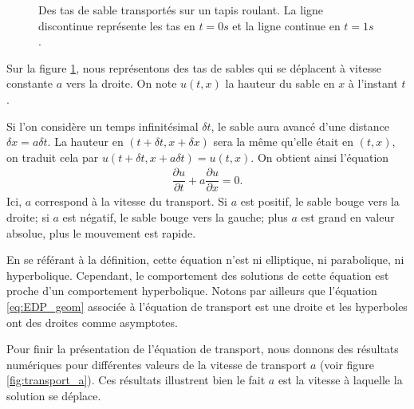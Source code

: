 \documentclass[12pt,a4paper,twoside]{article}
\begin{document}
\begin{figure}
\centering
\begin{tikzpicture}[scale = 0.5]
  
\end{tikzpicture}
\caption{Des tas de sable transport\'es sur un tapis roulant.
  La ligne discontinue repr\'esente les tas en $t=0s$ et la ligne
  continue en $t=1s$.}
\label{fig:transport}
\end{figure}

Sur la figure \ref{fig:transport}, nous repr\'esentons des tas de sables
qui se d\'eplacent \`a vitesse constante $a$ vers la droite.
On note $u(t,x)$ la hauteur du sable en $x$ \`a l'instant $t$.

Si l'on consid\`ere un temps infinit\'esimal $\delta t$,
le sable aura avanc\'e d'une distance $\delta x = a \delta t$.
La hauteur en $(t+\delta t , x + \delta x)$ sera la m\^eme qu'elle
\'etait en $(t,x)$, on traduit cela par $u(t+\delta t, x + a \delta t) = u(t,x)$.
On obtient ainsi l'\'equation
\begin{align}
  \dfrac{\partial u}{\partial t} + a \dfrac{\partial u}{\partial x} = 0 .
\end{align}
Ici, $a$ correspond \`a la vitesse du transport.
Si $a$ est positif, le sable bouge vers la droite; si $a$ est n\'egatif,
le sable bouge vers la gauche; plus $a$ est grand en valeur absolue, 
plus le mouvement est rapide.


\begin{remark}
  En se r\'ef\'erant \`a la d\'efinition, cette \'equation n'est ni elliptique, 
  ni parabolique, ni hyperbolique. Cependant, le comportement des solutions de 
  cette \'equation est proche d'un comportement hyperbolique.
  Notons par ailleurs que l'\'equation \eqref{eq:EDP_geom} associ\'ee
  \`a l'\'equation de transport est une droite et les hyperboles ont des droites
  comme asymptotes.
\end{remark}

Pour finir la pr\'esentation de l'\'equation de transport,
nous donnons des r\'esultats num\'eriques pour diff\'erentes
valeurs de la vitesse de transport $a$ (voir figure \ref{fig:transport_a}).
Ces r\'esultats illustrent bien le fait $a$ est la vitesse \`a laquelle
la solution se d\'eplace.
\end{document}
